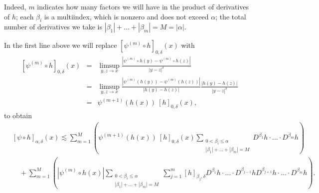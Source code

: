 \documentclass{amsart}
\theoremstyle{plain}
\numberwithin{equation}{section}
\begin{document}
Indeed, $m$ indicates how many factors we will have in the product of
derivatives of $h$; each $\beta _{i}$ is a multiindex, which is nonzero and
does not exceed $\alpha $; the total number of derivatives we take is $%
|\beta _{1}|+\dots +|\beta _{m}|=M=|\alpha|$.

In the first line above we will replace $\left[ \psi ^{(m)}\circ h\right]
_{0,\delta }\left( x\right) $ with 
\begin{eqnarray*}
\left[ \psi ^{(m)}\circ h\right] _{0,\delta }\left( x\right)
&=&\limsup_{y,z\rightarrow x}\frac{\left\vert \psi ^{(m)}\circ h\left(
y\right) -\psi ^{(m)}\circ h\left( z\right) \right\vert }{\left\vert
y-z\right\vert ^{\delta }} \\
&=&\limsup_{y,z\rightarrow x}\frac{\left\vert \psi ^{(m)}\left( h\left(
y\right) \right) -\psi ^{(m)}\left( h\left( z\right) \right) \right\vert }{
\left\vert h\left( y\right) -h\left( z\right) \right\vert }\frac{\left\vert
h\left( y\right) -h\left( z\right) \right\vert }{\left\vert y-z\right\vert
^{\delta }} \\
&=&\psi ^{(m+1)}\left( h\left( x\right) \right) \ \left[ h\right] _{0,\delta
}\left( x\right) ,
\end{eqnarray*}%
to obtain 
\begin{align*}
&\left[ \psi \circ h\right] _{\alpha ,\delta }(x) \lesssim
\sum_{m=1}^{M}\left( \psi ^{(m+1)}\left( h\left( x\right) \right) \ \left[ h%
\right] _{0,\delta }\left( x\right) \sum_{\substack{ 0<\beta _{i}\leq \alpha 
\\ |\beta _{1}|+\dots +|\beta _{m}|=M}}D^{\beta _{1}}h\cdot \dots \cdot
D^{\beta _{m}}h\right) \\
& \quad +\sum_{m=1}^{M}\left( \left\vert \psi ^{(m)}\circ h(x)\right\vert
\sum_{\substack{ 0<\beta _{i}\leq \alpha  \\ |\beta _{1}|+\dots +|\beta
_{m}|=M}}\sum_{j=1}^{m}[h]_{\beta _{j},\delta }D^{\beta _{1}}h\cdot \dots
\cdot D^{\beta _{j-1}}hD^{\beta _{j+1}}h\cdot \dots \cdot D^{\beta
_{m}}h\right) .
\end{align*}
\end{document}
